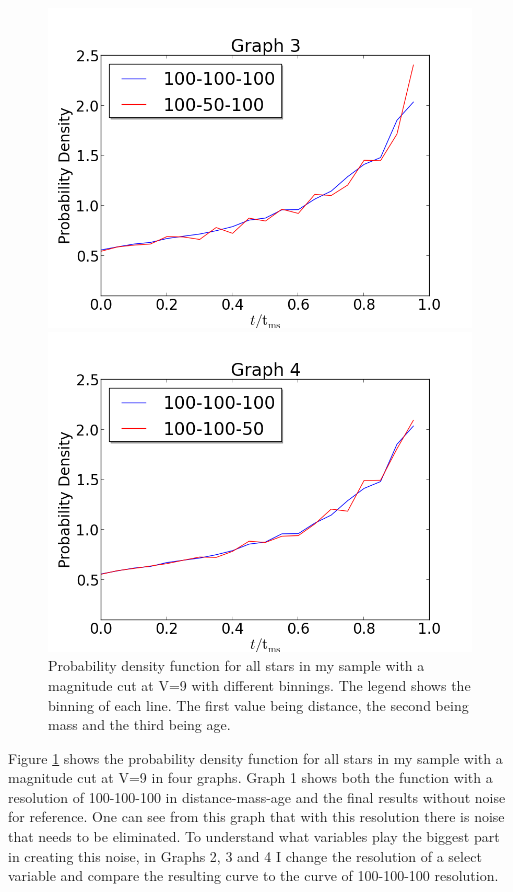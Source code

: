 \documentclass[a4paper,10pt]{article}
\begin{document}
\begin{figure}[h!]
\begin{minipage}{0.49\textwidth}
   \includegraphics[width=\textwidth]{100-50-100}
  \end{minipage}
  \begin{minipage}{0.49\textwidth}
   \includegraphics[width=\textwidth]{100-100-50}
  \end{minipage}
   \caption{Probability density function for all stars in my sample with a magnitude cut at V=9 with different binnings.
   The legend shows the binning of each line. The first value being distance, the second being mass and the third being age.\label{binnings}}
 \end{figure}
 
 Figure \ref{binnings} shows the probability density function for all stars in my sample with a magnitude cut at V=9 in four graphs. 
 Graph 1 shows both the function with a resolution of 100-100-100 in distance-mass-age and the final results without noise for reference. 
 One can see from this
 graph that with this resolution there is noise that needs to be eliminated. 
 To understand what variables play the biggest part in creating this noise, in Graphs 2, 3 and 4 I change the resolution of a select 
 variable and compare the resulting curve to the curve of 100-100-100 resolution.\\
 
\end{document}
